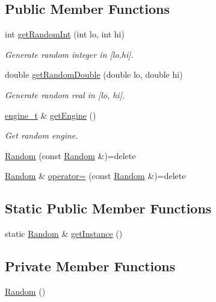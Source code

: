 \subsection*{Public Member Functions}
\begin{DoxyCompactItemize}
\item 
int \hyperlink{classRandom_a7365696fe6cb07dc6c686bfde4fbf4ae}{get\+Random\+Int} (int lo, int hi)
\begin{DoxyCompactList}\small\item\em Generate random integer in \mbox{[}lo,hi\mbox{]}. \end{DoxyCompactList}\item 
double \hyperlink{classRandom_a721d558ed4bf72c63ceec816c5819129}{get\+Random\+Double} (double lo, double hi)
\begin{DoxyCompactList}\small\item\em Generate random real in \mbox{[}lo, hi\mbox{]}. \end{DoxyCompactList}\item 
\hyperlink{classRandom_ab1090b767f3e771eb8f846079869d1b4}{engine\+\_\+t} \& \hyperlink{classRandom_aa4b65c7cd8e0ada6c0dca5937236dda0}{get\+Engine} ()
\begin{DoxyCompactList}\small\item\em Get random engine. \end{DoxyCompactList}\item 
\hyperlink{classRandom_a9bfadeaa4adc5ac44142d000b1c99441}{Random} (const \hyperlink{classRandom}{Random} \&)=delete
\item 
\hyperlink{classRandom}{Random} \& \hyperlink{classRandom_acc7a4d85a416a090cde22c9273e01f1e}{operator=} (const \hyperlink{classRandom}{Random} \&)=delete
\end{DoxyCompactItemize}
\subsection*{Static Public Member Functions}
\begin{DoxyCompactItemize}
\item 
static \hyperlink{classRandom}{Random} \& \hyperlink{classRandom_a2aa30d2f678fc76f75efc60356c6ea4d}{get\+Instance} ()
\end{DoxyCompactItemize}
\subsection*{Private Member Functions}
\begin{DoxyCompactItemize}
\item 
\hyperlink{classRandom_acb76b49c3903a3c4fb67fd216341f08d}{Random} ()
\end{DoxyCompactItemize}
